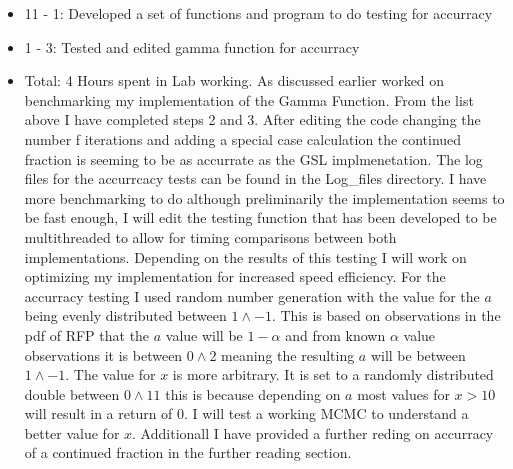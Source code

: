 \documentclass[12pt,hyperref]{labbook}
\begin{document}
\begin{itemize}
    \item 11 - 1: Developed a set of functions and program to do testing for accurracy
    \item 1 - 3: Tested and edited gamma function for accurracy
    \item Total: 4 Hours spent in Lab working.
As discussed earlier worked on benchmarking my implementation of the Gamma Function. From the list above I have completed steps 2 and 3. After editing the code changing the number f iterations and adding a special case calculation the continued fraction is seeming to be as accurrate as the GSL implmenetation. The log files for the accurrcacy tests can be found in the Log\_files directory.
I have more benchmarking to do although preliminarily the implementation seems to be fast enough, I will edit the testing function that has been developed to be multithreaded to allow for timing comparisons between both implementations. Depending on the results of this testing I will work on optimizing my implementation for increased speed efficiency.
For the accurracy testing I used random number generation with the value for the $a$ being evenly distributed between $1 \land -1$. This is based on observations in the pdf of RFP that the $a$ value will be $1 - \alpha$ and from known $\alpha$ value observations it is between $0 \land 2$ meaning the resulting $a$ will be between $1 \land -1$. The value for $x$ is more arbitrary. It is set to a randomly distributed double between $0 \land 11$ this is because depending on $a$ most values for $x > 10$ will result in a return of $0$. I will test a working MCMC to understand a better value for $x$. Additionall I have provided a further reding on accurracy of a continued fraction in the further reading section.
\end{itemize}
\end{document}
